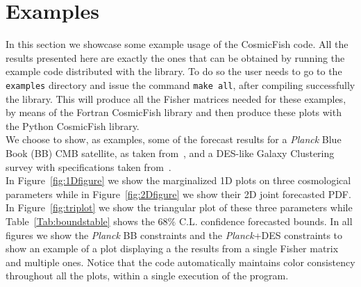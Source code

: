 \documentclass[prd,nofootinbib,showpacs]{revtex4}
\newcommand{\code}[1]{\lstinline|#1|}
\begin{document}
%
\section{Examples}
%
In this section we showcase some example usage of the CosmicFish code. All the results presented here are exactly the ones that can be obtained by running the example code distributed with the library.
To do so the user needs to go to the \code{examples} directory and issue the command \code{make all}, after compiling successfully the library.
This will produce all the Fisher matrices needed for these examples, by means of the Fortran CosmicFish library and then produce these plots with the Python CosmicFish library. \\
%
We choose to show, as examples, some of the forecast results for a {\it Planck} Blue Book (BB) CMB satellite, as taken from~\cite{bluebook}, and a DES-like Galaxy Clustering survey with specifications taken from~\cite{Lahav:2009zr}. \\
%
In Figure~\ref{fig:1Dfigure} we show the marginalized 1D plots on three cosmological parameters while in Figure~\ref{fig:2Dfigure} we show their 2D joint forecasted PDF. In Figure~\ref{fig:triplot} we show the triangular plot of these three parameters while Table~\ref{Tab:boundstable} shows the $68\%$ C.L. confidence forecasted bounds. In all figures we show the {\it Planck} BB constraints and the {\it Planck}+DES constraints to show an example of a plot displaying a the results from a single Fisher matrix and multiple ones. Notice that the code automatically maintains color consistency throughout all the plots, within a single execution of the program.
\end{document}
